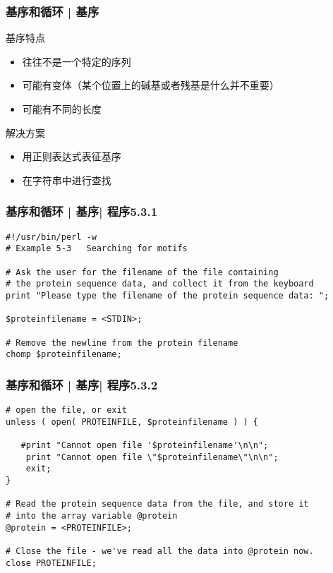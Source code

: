 \begin{frame}
  \frametitle{基序和循环 | 基序}
  \begin{block}{基序特点}
    \begin{itemize}
      \item 往往不是一个特定的序列
      \item 可能有变体（某个位置上的碱基或者残基是什么并不重要）
      \item 可能有不同的长度
    \end{itemize}
  \end{block}
  \pause
  \begin{block}{解决方案}
    \begin{itemize}
      \item 用正则表达式表征基序
      \item 在字符串中进行查找
    \end{itemize}
  \end{block}
\end{frame}

\begin{frame}[fragile]
  \frametitle{基序和循环 | 基序| 程序5.3.1}
\begin{lstlisting}[firstnumber=1]
#!/usr/bin/perl -w
# Example 5-3   Searching for motifs

# Ask the user for the filename of the file containing
# the protein sequence data, and collect it from the keyboard
print "Please type the filename of the protein sequence data: ";

$proteinfilename = <STDIN>;

# Remove the newline from the protein filename
chomp $proteinfilename;
\end{lstlisting}
\end{frame}

\begin{frame}[fragile]
  \frametitle{基序和循环 | 基序| 程序5.3.2}
\begin{lstlisting}[firstnumber=13,basicstyle=\small\tt]
# open the file, or exit
unless ( open( PROTEINFILE, $proteinfilename ) ) {

   #print "Cannot open file '$proteinfilename'\n\n";
    print "Cannot open file \"$proteinfilename\"\n\n";
    exit;
}

# Read the protein sequence data from the file, and store it
# into the array variable @protein
@protein = <PROTEINFILE>;

# Close the file - we've read all the data into @protein now.
close PROTEINFILE;
\end{lstlisting}
\end{frame}


